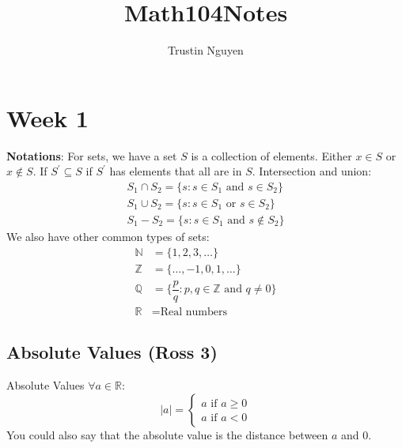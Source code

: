 \documentclass{report}
\title{Math104Notes}
\author{Trustin Nguyen}
\begin{document}

\begin{titlepage}
    \maketitle
\end{titlepage}
\tableofcontents
\restoregeometry

\reversemarginpar

\chapter{Week 1}

\textbf{Notations}: For sets, we have a set $S$ is a collection of elements. Either $x \in S$ or $x \notin S $. If $S^{\prime} \subseteq S$ if $S^{\prime}$ has elements that all are in $S$. Intersection and union:
    \begin{align*}
        S_{1} \cap S_{2} = \{s : s \in S_{1} \text{ and } s \in S_{2}\} \\
        S_{1} \cup  S_{2} = \{s : s \in S_{1} \text{ or } s \in S_{2}\} \\
        S_{1} - S_{2} = \{s : s \in S_{1} \text{ and } s \notin S_{2}\}
    \end{align*}
We also have other common types of sets:
    \begin{align*}
        \mathbb{N} &= \{1, 2, 3, \ldots\}                                          \\
        \mathbb{Z} &= \{\ldots, -1, 0, 1, \ldots\}                                 \\
        \mathbb{Q} &= \{\dfrac{p}{q} : p, q \in \mathbb{Z} \text{ and } q \neq 0\} \\
        \mathbb{R} &= \text{Real numbers}                                            
    \end{align*}

\begin{topic}
    \section{Absolute Values (Ross 3)}
\end{topic}

\begin{definition}{Absolute Values}
        $\forall a \in \mathbb{R}$:
            \begin{equation*}
                \lvert a \rvert = 
                    \begin{cases}
                        a \text{ if } a \geq 0 \\
                        a \text{ if } a < 0
                    \end{cases}
            \end{equation*}
        You could also say that the absolute value is the distance between $a$ and $0$.
    \end{definition}
\end{document}
